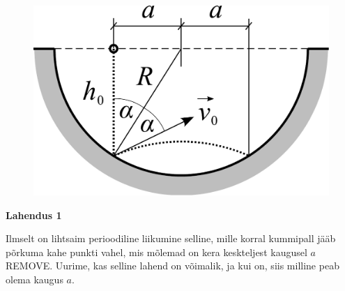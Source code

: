 \documentclass[10pt]{article}
\newcommand{\p}[1]{REMOVE}
\begin{document}

\solu
\begin{figure}
\vspace{-1.1cm}
  \begin{center}
    \includegraphics[width=1\linewidth]{2024-v2g-10-yl1.pdf}
  \end{center}
  \vspace{-1cm}
\end{figure}

\textbf{Lahendus 1}

Ilmselt on lihtsaim perioodiline liikumine selline, mille korral kummipall jääb põrkuma kahe punkti vahel, mis mõlemad on kera keskteljest kaugusel $a$ \p{1}. Uurime, kas selline lahend on võimalik, ja kui on, siis milline peab olema kaugus $a$. 
\end{document}
